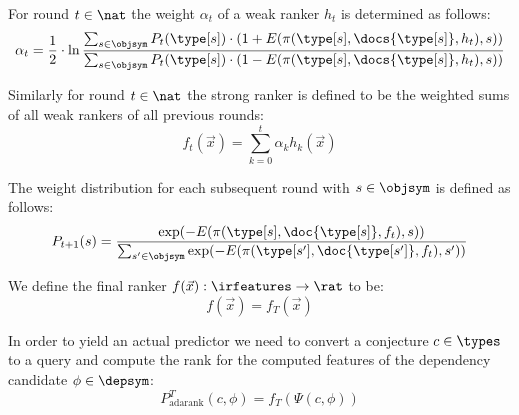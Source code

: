 \begin{definition}
  For round $t \in \nat$ the weight $\alpha_t$ of a weak ranker $h_t$ is determined as follows:
  \[
    \alpha_t = \frac{1}{2} \cdot \ln \frac{
      \sum_{s \in \objsym} P_t(\type[s]) \cdot ( 1 + E(\pi(\type[s], \docs{\type[s]}, h_t), s) )
    }{
      \sum_{s \in \objsym} P_t(\type[s]) \cdot ( 1 - E(\pi(\type[s], \docs{\type[s]}, h_t), s) )
    }
  \]
\end{definition}

\begin{definition}
  Similarly for round $t \in \nat$ the strong ranker is defined to be the weighted
  sums of all weak rankers of all previous rounds:
  $$ f_t(\vec{x}) = \sum_{k=0}^{t} \alpha_k h_k(\vec{x}) $$
\end{definition}

\begin{definition}
  The weight distribution for each subsequent round with $s \in \objsym$ is defined as follows:
  $$
    P_{t+1}(s) = \frac{
      \exp(- E(\pi(\type[s], \doc{\type[s]}, f_t), s))
    }{
      \sum_{s' \in \objsym} \exp(- E(\pi(\type[s'], \doc{\type[s']}, f_t), s'))
    }
  $$
\end{definition}

\begin{definition}
  We define the final ranker $f(\vec{x}) : \irfeatures \rightarrow \rat$ to be:
  $$ f(\vec{x}) = f_T(\vec{x})$$
\end{definition}

\begin{definition}
  In order to yield an actual predictor we need to convert a conjecture $c \in \types$
  to a query and compute the rank for the computed features of the dependency candidate $\phi \in \depsym$:
  $$ P_{\text{adarank}}^T(c, \phi) = f_T(\Psi(c, \phi)) $$
\end{definition}
